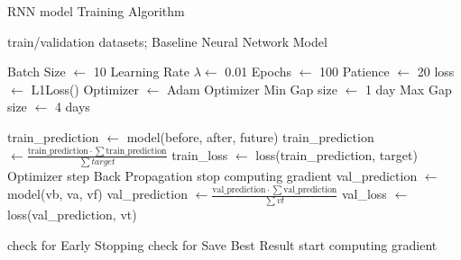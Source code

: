 \begin{algorithm}[H]
	\caption{RNN model Training Algorithm}\label{alg:grruntraining}
	\begin{algorithmic}
		\Require train/validation datasets; Baseline Neural Network Model

		\State Batch Size $\gets$ 10
		\State Learning Rate $\lambda \gets$ 0.01
		\State Epochs $\gets$ 100
		\State Patience $\gets$ 20
		\State loss $\gets$ L1Loss()
		\State Optimizer $\gets$ Adam Optimizer
		\State Min Gap size $\gets$ 1 day
		\State Max Gap size $\gets$ 4 days
		\State

		\State train\_prediction $\gets$ model(before, after, future) 
		\State train\_prediction $\gets \frac{\text{train\_prediction} \cdot \sum\text{train\_prediction}}{\sum target}$ 
		\State train\_loss $\gets$ loss(train\_prediction, target)
		\State Optimizer step
		\State Back Propagation
		\EndFor
		\State stop computing gradient
		\State val\_prediction $\gets$ model(vb, va, vf) 
		\State val\_prediction $\gets \frac{\text{val\_prediction} \cdot \sum\text{val\_prediction}}{\sum vt}$ 
		\State val\_loss $\gets$ loss(val\_prediction, vt)
		\EndFor

		\State check for Early Stopping
		\State check for Save Best Result
		\State start computing gradient
		\EndFor
	\end{algorithmic}
\end{algorithm}

